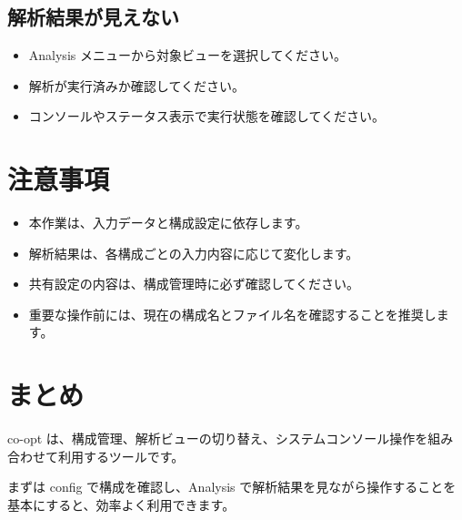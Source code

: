 \documentclass[11pt]{article}
\begin{document}
\subsection{解析結果が見えない}
\begin{itemize}
  \item Analysis メニューから対象ビューを選択してください。
  \item 解析が実行済みか確認してください。
  \item コンソールやステータス表示で実行状態を確認してください。
\end{itemize}

\section{注意事項}
\begin{itemize}
  \item 本作業は、入力データと構成設定に依存します。
  \item 解析結果は、各構成ごとの入力内容に応じて変化します。
  \item 共有設定の内容は、構成管理時に必ず確認してください。
  \item 重要な操作前には、現在の構成名とファイル名を確認することを推奨します。
\end{itemize}

\section{まとめ}
co-opt は、構成管理、解析ビューの切り替え、システムコンソール操作を組み合わせて利用するツールです。\par
まずは config で構成を確認し、Analysis で解析結果を見ながら操作することを基本にすると、効率よく利用できます。
\end{document}
